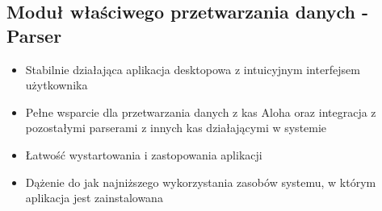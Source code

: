 \documentclass[a4paper]{book}
\begin{document}
\subsection{Moduł właściwego przetwarzania danych - Parser} 
 \begin{itemize}
 	\item Stabilnie działająca aplikacja desktopowa z intuicyjnym interfejsem użytkownika
 	\item Pełne wsparcie dla przetwarzania danych z kas Aloha oraz integracja z pozostałymi parserami z innych kas działającymi w systemie
 	\item Łatwość wystartowania i zastopowania aplikacji
 	\item Dążenie do jak najniższego wykorzystania zasobów systemu, w którym aplikacja jest zainstalowana
 \end{itemize}
\end{document}

